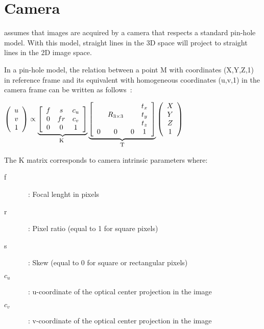\section{Camera}
\label{sec:camera}
\rox assumes that images are acquired by a camera that respects a standard pin-hole model. 
With this model, straight lines in the 3D space will project to straight lines in the 2D image space.

In a pin-hole model, the relation between a point M with coordinates
(X,Y,Z,1) in reference frame and its equivalent with homogeneous
coordinates (u,v,1) in the camera frame can be written as follows~:
\begin{center}
$
\left( \begin{array}{c} u \\ v \\ 1 \\ \end{array} \right) \propto
\underbrace{\left[ \begin{array}{ccc} f & s & c_u \\ 0 & f r & c_v \\ 0 & 0 & 1 \end{array} \right]}_{\mbox{\footnotesize{K }}} 
\underbrace{\left[ \begin{array}{cccc} & & & t_x \\ & R_{3\times3} & & t_y \\ & & & t_z \\ 0&0&0&1 \end{array} \right]}_{\mbox{\footnotesize{T}}} 
\left( \begin{array}{c} X \\ Y \\ Z \\ 1\\ \end{array} \right)
$
\end{center}

The K matrix corresponds to camera intrinsic parameters where:
\begin{description}
   \item [f]~: Focal lenght in pixels
   \item [r]~: Pixel ratio (equal to 1 for square pixels)
   \item [s]~: Skew (equal to 0 for square or rectangular pixels)
   \item [$c_u$]~: u-coordinate of the optical center projection in the image
   \item [$c_v$]~: v-coordinate of the optical center projection in the image
\end{description}

